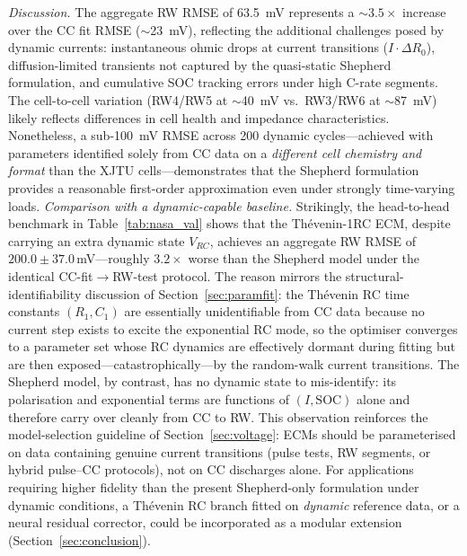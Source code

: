 \documentclass[5p,times,number]{elsarticle}
\newcommand{\tabref}[1]{\hyperref[#1]{\textup{Table~\ref*{#1}}}}
\newcommand{\secref}[1]{\hyperref[#1]{\textup{Section~\ref*{#1}}}}
\def\tabref#1{Table~\ref{#1}}
\def\secref#1{Section~\ref{#1}}
\begin{document}
\emph{Discussion.}
The aggregate RW RMSE of \SI{63.5}{\milli\volt} represents a $\sim 3.5\times$ increase over the CC fit RMSE ($\sim$\SI{23}{\milli\volt}), reflecting the additional challenges posed by dynamic currents: instantaneous ohmic drops at current transitions ($I \cdot \Delta R_0$), diffusion-limited transients not captured by the quasi-static Shepherd formulation, and cumulative SOC tracking errors under high C-rate segments.
The cell-to-cell variation (RW4/RW5 at $\sim$\SI{40}{\milli\volt} vs.\ RW3/RW6 at $\sim$\SI{87}{\milli\volt}) likely reflects differences in cell health and impedance characteristics.
Nonetheless, a sub-\SI{100}{\milli\volt} RMSE across 200 dynamic cycles---achieved with parameters identified solely from CC data on a \emph{different cell chemistry and format} than the XJTU cells---demonstrates that the Shepherd formulation provides a reasonable first-order approximation even under strongly time-varying loads.
\emph{Comparison with a dynamic-capable baseline.} Strikingly, the head-to-head benchmark in \tabref{tab:nasa_val} shows that the Th\'{e}venin-1RC ECM, despite carrying an extra dynamic state $V_{RC}$, achieves an aggregate RW RMSE of $200.0 \pm 37.0$\,mV---roughly $3.2\times$ worse than the Shepherd model under the identical CC-fit$\to$RW-test protocol. The reason mirrors the structural-identifiability discussion of \secref{sec:paramfit}: the Th\'{e}venin RC time constants $(R_1, C_1)$ are essentially unidentifiable from CC data because no current step exists to excite the exponential RC mode, so the optimiser converges to a parameter set whose RC dynamics are effectively dormant during fitting but are then exposed---catastrophically---by the random-walk current transitions. The Shepherd model, by contrast, has no dynamic state to mis-identify: its polarisation and exponential terms are functions of $(I, \mathrm{SOC})$ alone and therefore carry over cleanly from CC to RW. This observation reinforces the model-selection guideline of \secref{sec:voltage}: ECMs should be parameterised on data containing genuine current transitions (pulse tests, RW segments, or hybrid pulse--CC protocols), not on CC discharges alone.
For applications requiring higher fidelity than the present Shepherd-only formulation under dynamic conditions, a Th\'{e}venin RC branch fitted on \emph{dynamic} reference data, or a neural residual corrector, could be incorporated as a modular extension (\secref{sec:conclusion}).
\end{document}
